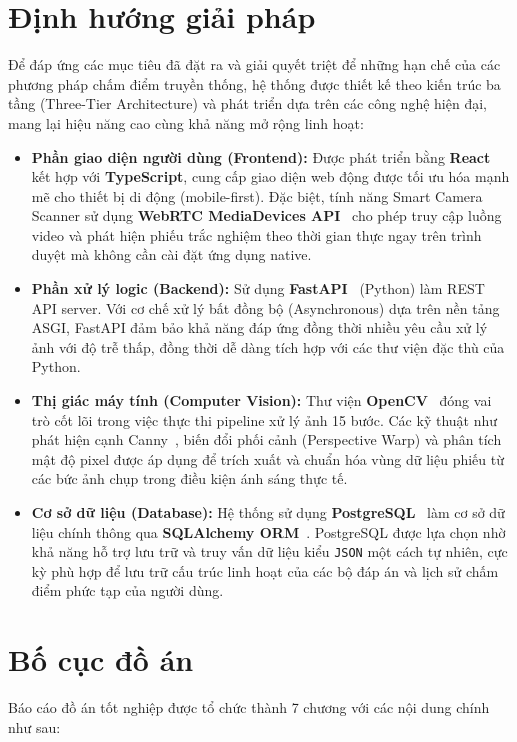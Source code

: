 \section{Định hướng giải pháp}
Để đáp ứng các mục tiêu đã đặt ra và giải quyết triệt để những hạn chế của các phương pháp chấm điểm truyền thống, hệ thống được thiết kế theo kiến trúc ba tầng (Three-Tier Architecture) và phát triển dựa trên các công nghệ hiện đại, mang lại hiệu năng cao cùng khả năng mở rộng linh hoạt:

\begin{itemize}
    \item \textbf{Phần giao diện người dùng (Frontend):} Được phát triển bằng \textbf{React} kết hợp với \textbf{TypeScript}, cung cấp giao diện web động được tối ưu hóa mạnh mẽ cho thiết bị di động (mobile-first). Đặc biệt, tính năng Smart Camera Scanner sử dụng \textbf{WebRTC MediaDevices API}~\cite{webrtc} cho phép truy cập luồng video và phát hiện phiếu trắc nghiệm theo thời gian thực ngay trên trình duyệt mà không cần cài đặt ứng dụng native.

    \item \textbf{Phần xử lý logic (Backend):} Sử dụng \textbf{FastAPI}~\cite{fastapi} (Python) làm REST API server. Với cơ chế xử lý bất đồng bộ (Asynchronous) dựa trên nền tảng ASGI, FastAPI đảm bảo khả năng đáp ứng đồng thời nhiều yêu cầu xử lý ảnh với độ trễ thấp, đồng thời dễ dàng tích hợp với các thư viện đặc thù của Python.

    \item \textbf{Thị giác máy tính (Computer Vision):} Thư viện \textbf{OpenCV}~\cite{opencv,learning-opencv} đóng vai trò cốt lõi trong việc thực thi pipeline xử lý ảnh 15 bước. Các kỹ thuật như phát hiện cạnh Canny~\cite{canny}, biến đổi phối cảnh (Perspective Warp) và phân tích mật độ pixel được áp dụng để trích xuất và chuẩn hóa vùng dữ liệu phiếu từ các bức ảnh chụp trong điều kiện ánh sáng thực tế.

    \item \textbf{Cơ sở dữ liệu (Database):} Hệ thống sử dụng \textbf{PostgreSQL}~\cite{postgresql} làm cơ sở dữ liệu chính thông qua \textbf{SQLAlchemy ORM}~\cite{sqlalchemy}. PostgreSQL được lựa chọn nhờ khả năng hỗ trợ lưu trữ và truy vấn dữ liệu kiểu \texttt{JSON} một cách tự nhiên, cực kỳ phù hợp để lưu trữ cấu trúc linh hoạt của các bộ đáp án và lịch sử chấm điểm phức tạp của người dùng.
\end{itemize}
\section{Bố cục đồ án}
Báo cáo đồ án tốt nghiệp được tổ chức thành 7 chương với các nội dung chính như sau:

